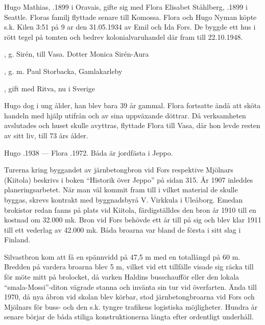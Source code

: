 Hugo Mathias, .1899 i Oravais, gifte sig med Flora Elisabet Ståhlberg, .1899 i Seattle. Floras familj flyttade senare till Komossa. Flora och Hugo Nyman köpte s.k. Kilen 3:51 på 9 ar den 31.05.1934 av Emil och Ida Fors. De byggde ett hus i rött tegel på tomten och bedrev kolonialvaruhandel där fram till 22.10.1948.
\begin{jhchildren}
  \item {}, g. Sirén, till Vasa. Dotter Monica Sirén-Aura
  \item {}, g. m. Paul Storbacka, Gamlakarleby
  \item {}, gift med Ritva, nu i Sverige
\end{jhchildren}
Hugo dog i ung ålder, han blev bara 39 år gammal. Flora fortsatte ändå att sköta handeln med hjälp utifrån och av sina uppväxande döttrar. Då verksamheten avslutades och huset skulle avyttras, flyttade Flora till Vasa, där hon levde resten av sitt liv, till 73 års ålder.

Hugo .1938  ---  Flora .1972. Båda är jordfästa i Jeppo.





Turerna kring byggandet av järnbetongbron vid Fors respektive Mjölnars (Kiitola) beskrivs i boken ``Historik över Jeppo'' på sidan 315. År 1907 inleddes planeringsarbetet. När man väl kommit fram till i vilket material de skulle byggas, skrevs kontrakt med byggnadsbyrå V. Virkkula i Uleåborg. Emedan brokistor redan fanns på plats vid Kiitola, färdigställdes den bron år 1910 till en kostnad om 32.000 mk. Bron vid Fors behövde ett år till på sig och blev klar 1911 till ett vederlag av 42.000 mk. Båda broarna var bland de första i sitt slag i Finland.


Silvastbron kom att få en spännvidd på 47,5 m med en totallängd på 60 m. Bredden på vardera broarna blev 5 m, vilket vid ett tillfälle visade sig räcka till för möte mitt på brolocket, då varken Haldins busschaufför eller den lokala ``smala-Mossi''-diton vägrade stanna och invänta sin tur vid överfarten. Ända till 1970, då nya åbron vid skolan blev körbar, stod järnbetongbroarna vid Fors och Mjölnars för buss- och den s.k. tyngre trafikens logistiska möjligheter. Hundra år senare börjar de båda stiliga konstruktionerna längta efter ordentligt underhåll.




